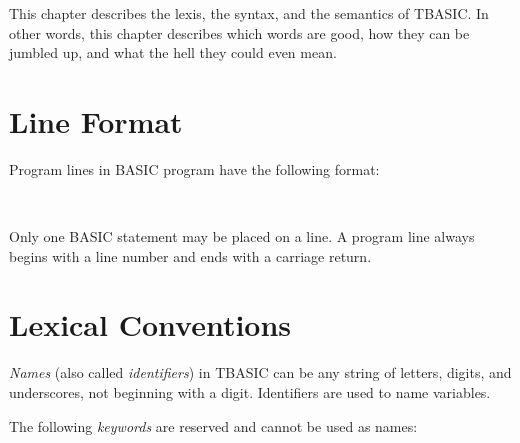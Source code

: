 This chapter describes the lexis, the syntax, and the semantics of TBASIC. In other words, this chapter describes which words are good, how they can be jumbled up, and what the hell they could even mean.

\section{Line Format}

Program lines in BASIC program have the following format:

 \

Only one BASIC statement may be placed on a line. A program line always begins with a line number and ends with a carriage return.


\section{Lexical Conventions}

\emph{Names} (also called \emph{identifiers}) in TBASIC can be any string of letters, digits, and underscores, not beginning with a digit. Identifiers are used to name variables.

The following \emph{keywords} are reserved and cannot be used as names:

